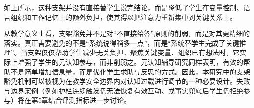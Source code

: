 如上所示，这种支架并没有直接替学生说完结论，而是降低了学生在变量控制、语言组织和工作记忆上的额外负担，使其得以把注意力重新集中到关键关系上。

从教学意义上看，支架豁免并不是对“不直接给答”原则的削弱，而是对其更精细的落实。真正需要避免的不是“系统说得稍多一点”，而是“系统替学生完成了关键推理”。当支架仅仅帮助学生减少无关负担、聚焦关键变量、组织已有想法时，它实际上增强了学生的元认知参与，而非削弱之。元认知辅导研究同样表明，有效的帮助不是简单增加信息量，而是优化学生求助与反思的方式\cite{aleven2004toward,roll2011improving}。因此，本研究中的支架豁免机制可以被视为在教学安全边界内对认知过载进行调节的一种必要设计。失败与边界案例（例如护栏连续触发仍无法恢复有效互动、或事实兜底后学生仍拒绝参与）将在第5章结合评测指标进一步讨论。
